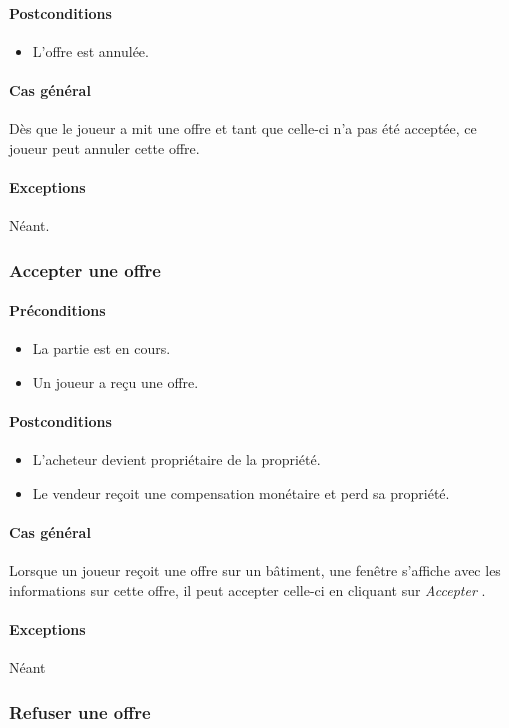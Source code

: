 \documentclass[a4paper,11pt]{report}
\begin{document}
\paragraph{Postconditions}
\begin{itemize}
 \item L'offre est annulée.
\end{itemize}
\paragraph{Cas général}
Dès que le joueur a mit une offre et tant que celle-ci n'a pas été acceptée, ce joueur peut annuler cette offre.
\paragraph{Exceptions} Néant.
\subsubsection{Accepter une offre}
\paragraph{Préconditions}
\begin{itemize}
 \item La partie est en cours.
 \item Un joueur a reçu une offre.
\end{itemize}
\paragraph{Postconditions}
\begin{itemize}
 \item L'acheteur devient propriétaire de la propriété.
 \item Le vendeur reçoit une compensation monétaire et perd sa propriété.
\end{itemize}
\paragraph{Cas général}
Lorsque un joueur reçoit une offre sur un bâtiment, une fenêtre s'affiche avec les informations sur cette offre, il peut accepter celle-ci en cliquant sur \og \textit{Accepter} \fg.
\paragraph{Exceptions} Néant
\subsubsection{Refuser une offre}
\end{document}
